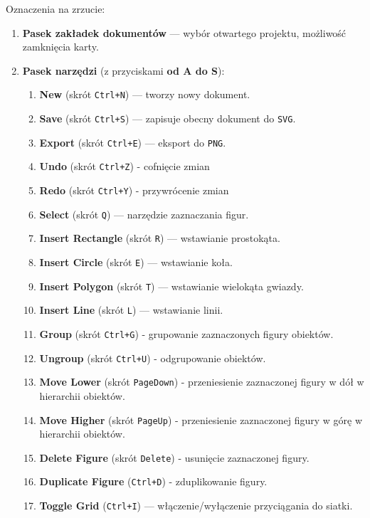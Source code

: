 \documentclass[a4paper,12pt]{article}
\begin{document}
\noindent Oznaczenia na zrzucie:
\begin{enumerate}
    \item \textbf{Pasek zakładek dokumentów} — wybór otwartego projektu, 
    możliwość zamknięcia karty.
    \item \textbf{Pasek narzędzi} (z przyciskami \textbf{od A do S}):
    \begin{enumerate}[label=\alph*)]
        \item \textbf{New} (skrót \texttt{Ctrl+N}) — tworzy nowy dokument.
        \item \textbf{Save} (skrót \texttt{Ctrl+S}) — zapisuje obecny dokument do \texttt{SVG}.
        \item \textbf{Export} (skrót \texttt{Ctrl+E}) — eksport do \texttt{PNG}.
        \item \textbf{Undo} (skrót \texttt{Ctrl+Z}) - cofnięcie zmian
        \item \textbf{Redo} (skrót \texttt{Ctrl+Y}) - przywrócenie zmian
        \item \textbf{Select} (skrót \texttt{Q}) — narzędzie zaznaczania figur.
        \item \textbf{Insert Rectangle} (skrót \texttt{R}) — wstawianie prostokąta.
        \item \textbf{Insert Circle} (skrót \texttt{E}) — wstawianie koła.
        \item \textbf{Insert Polygon} (skrót \texttt{T}) — wstawianie wielokąta gwiazdy.
        \item \textbf{Insert Line} (skrót \texttt{L}) — wstawianie linii.
        \item \textbf{Group} (skrót \texttt{Ctrl+G}) - grupowanie zaznaczonych figury obiektów.
        \item \textbf{Ungroup} (skrót \texttt{Ctrl+U}) - odgrupowanie obiektów.
        \item \textbf{Move Lower} (skrót \texttt{PageDown}) - przeniesienie zaznaczonej figury w dół w hierarchii obiektów.
        \item \textbf{Move Higher} (skrót \texttt{PageUp}) - przeniesienie zaznaczonej figury w górę w hierarchii obiektów.
        \item \textbf{Delete Figure} (skrót \texttt{Delete}) - usunięcie zaznaczonej figury.
        \item \textbf{Duplicate Figure} (\texttt{Ctrl+D}) - zduplikowanie figury.
        \item \textbf{Toggle Grid} (\texttt{Ctrl+I}) — włączenie/wyłączenie przyciągania do siatki.

\end{enumerate}
\end{enumerate}
\end{document}
